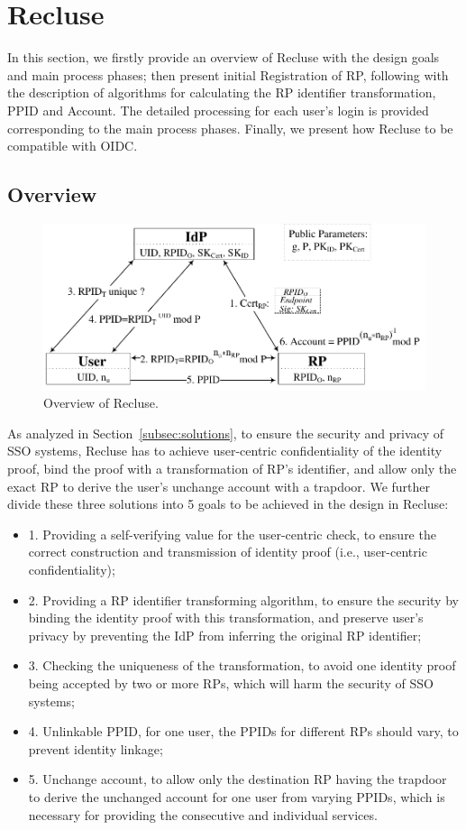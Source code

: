\section{Recluse}
\label{sec:Recluse}
In this section, we firstly provide an overview of Recluse with the design goals and main process phases; then present initial Registration of RP, following with the description of algorithms for calculating the RP identifier transformation, PPID and Account. The detailed processing for each user's login is provided corresponding to the main process phases. Finally, we present how Recluse to be compatible with OIDC.

\subsection{Overview}
\label{subsec:overview}
\begin{figure}
  \centering
  \includegraphics[width=\linewidth]{fig/Overview.pdf}
  \caption{Overview of Recluse.}
  \label{fig:overview}
\end{figure}

As analyzed in Section~\ref{subsec:solutions}, to ensure the security and privacy of SSO systems, Recluse has to achieve user-centric confidentiality of the identity proof, bind the proof with a transformation of RP’s identifier, and allow only the exact RP to derive the user's unchange account with a trapdoor. We further divide these three solutions into 5 goals to be achieved in the design in Recluse:
\begin{itemize}
  \item 1. Providing a self-verifying value for the user-centric check, to ensure the correct construction and transmission of identity proof (i.e., user-centric confidentiality);
  \item 2. Providing a RP identifier transforming algorithm, to ensure the security by binding the identity proof with this transformation, and preserve user's privacy by preventing the IdP from inferring the original RP identifier;
  \item 3. Checking the uniqueness of the transformation, to avoid one identity proof being accepted by two or more RPs, which will harm the security of SSO systems;
  \item 4. Unlinkable PPID, for one user, the PPIDs for different RPs should vary, to prevent identity linkage;
  \item 5. Unchange account, to allow only the destination RP having the trapdoor to derive the unchanged account for one user from varying PPIDs, which is necessary for providing the consecutive and individual services.
\end{itemize}

